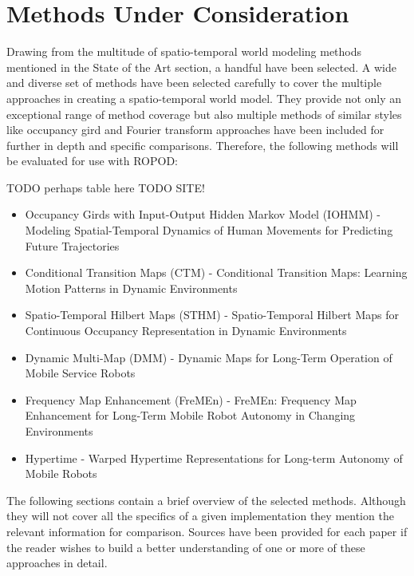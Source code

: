   \section{ Methods Under Consideration }

  Drawing from the multitude of spatio-temporal world modeling methods mentioned
  in the State of the Art section, a handful have been selected. A wide and
  diverse set of methods have been selected carefully to cover the multiple
  approaches in creating a spatio-temporal world model. They provide not only
  an exceptional range of method coverage but also multiple methods of similar
  styles like occupancy gird and Fourier transform approaches have been included
  for further in depth and specific comparisons. Therefore, the following
  methods will be evaluated for use with ROPOD:

  TODO perhaps table here
  TODO SITE!
  \begin{itemize}
    \item Occupancy Girds with Input-Output Hidden Markov Model (IOHMM) - Modeling Spatial-Temporal Dynamics of Human Movements for Predicting Future Trajectories \cite{Wang2015}
    \item Conditional Transition Maps (CTM) - Conditional Transition Maps: Learning Motion Patterns in Dynamic Environments \cite{Kucner2013}
    \item Spatio-Temporal Hilbert Maps (STHM) - Spatio-Temporal Hilbert Maps for Continuous Occupancy Representation in Dynamic Environments \cite{Senanayake2016}
    \item Dynamic Multi-Map (DMM) - Dynamic Maps for Long-Term Operation of Mobile Service Robots \cite{biber2005}
    \item Frequency Map Enhancement (FreMEn) - FreMEn: Frequency Map Enhancement for Long-Term Mobile Robot Autonomy in Changing Environments \cite{Krajnik2015}
    \item Hypertime - Warped Hypertime Representations for Long-term Autonomy of Mobile Robots \cite{kranjik2018}
  \end{itemize}

  The following sections contain a brief overview of the selected methods.
  Although they will not cover all the specifics of a given implementation they
  mention the relevant information for comparison. Sources have been provided
  for each paper if the reader wishes to build a better understanding of one
  or more of these approaches in detail.


